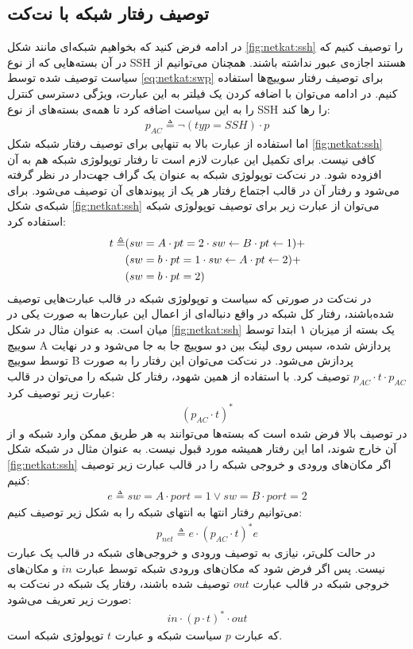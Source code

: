 \subsection{توصیف رفتار شبکه با نت‌کت}
در ادامه فرض کنید که بخواهیم شبکه‌ای مانند شکل
\ref{fig:netkat:ssh}
را توصیف کنیم که در آن بسته‌هایی که از نوع
SSH
هستند اجازه‌ی عبور نداشته باشند.
همچنان می‌توانیم از سیاست توصیف شده توسط
\ref{eq:netkat:swp}
برای توصیف رفتار سوییچ‌ها استفاده کنیم.
در ادامه می‌توان با اضافه کردن یک فیلتر به این عبارت، ویژگی دسترسی کنترل
را به این سیاست اضافه کرد تا همه‌ی بسته‌های از نوع
SSH
را رها کند:
\begin{align*}
    p_{AC} \triangleq \neg(typ = SSH)\cdot p
\end{align*}
اما استفاده از عبارت بالا به تنهایی برای توصیف رفتار شبکه شکل
\ref{fig:netkat:ssh}
کافی‌ نیست.
برای تکمیل این عبارت لازم است تا رفتار توپولوژی
شبکه‌ هم به آن افزوده شود.
در نت‌کت توپولوژی شبکه به عنوان یک گراف جهت‌دار در نظر گرفته می‌شود و رفتار آن در قالب اجتماع رفتار هر یک از پیوندهای
آن توصیف می‌شود.
برای شبکه‌ی شکل
\ref{fig:netkat:ssh}
می‌توان از عبارت زیر برای توصیف توپولوژی شبکه استفاده کرد:
\begin{align*}
    t \triangleq & (sw = A \cdot pt = 2 \cdot sw \leftarrow B \cdot pt \leftarrow 1) + \\
                 & (sw = b \cdot pt = 1 \cdot sw \leftarrow A \cdot pt \leftarrow 2) + \\
                 & (sw = b \cdot pt = 2)
\end{align*}
در نت‌کت در صورتی که سیاست و توپولوژی شبکه در قالب عبارت‌هایی توصیف شده‌باشند،
رفتار کل شبکه در واقع دنباله‌ای از اعمال این عبارت‌ها به صورت یکی در میان است.
به عنوان مثال در شکل
\ref{fig:netkat:ssh}
یک بسته از میزبان ۱ ابتدا توسط سوییچ
A
پردازش شده، سپس روی لینک بین دو سوییچ جا به جا می‌شود و در نهایت توسط سوییچ
B
پردازش می‌شود.
در نت‌کت می‌توان این رفتار را به صورت
$p_{AC}\cdot t \cdot p_{AC}$
توصیف کرد.
با استفاده از همین شهود، رفتار کل شبکه را می‌توان در قالب عبارت زیر توصیف کرد:
\begin{align*}
    (p_{AC}\cdot t)^*
\end{align*}
در توصیف بالا فرض شده است که بسته‌ها می‌توانند به هر طریق ممکن وارد شبکه و از آن خارج شوند، اما این رفتار همیشه مورد قبول نیست.
به عنوان مثال در شبکه شکل
\ref{fig:netkat:ssh}
اگر مکان‌های ورودی و خروجی شبکه را در قالب عبارت زیر توصیف کنیم:
\begin{align*}
    e \triangleq sw = A\cdot port = 1 \vee sw = B \cdot port = 2
\end{align*}
می‌توانیم رفتار انتها به انتهای
شبکه را به شکل زیر توصیف کنیم:
\begin{align*}
    p_{net} \triangleq e \cdot (p_{AC}\cdot t)^* e
\end{align*}
در حالت کلی‌تر، نیازی به توصیف ورودی و خروجی‌های شبکه در قالب یک عبارت نیست.
پس اگر فرض شود که مکان‌های ورودی شبکه توسط عبارت
$in$
و مکان‌های خروجی شبکه در قالب عبارت
$out$
توصیف شده‌ باشند، رفتار یک شبکه در نت‌کت به صورت زیر تعریف می‌شود:
\begin{align*}
    in \cdot (p\cdot t)^*\cdot out
\end{align*}
که عبارت
$p$
سیاست شبکه و عبارت
$t$
توپولوژی شبکه است.


